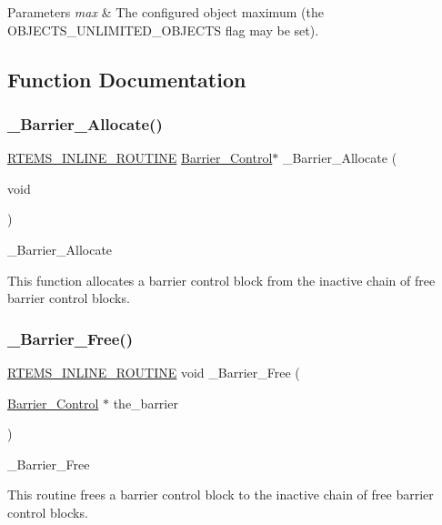 \begin{DoxyParams}{Parameters}
{\em max} & The configured object maximum (the O\+B\+J\+E\+C\+T\+S\+\_\+\+U\+N\+L\+I\+M\+I\+T\+E\+D\+\_\+\+O\+B\+J\+E\+C\+TS flag may be set). \\
\hline
\end{DoxyParams}


\subsection{Function Documentation}
\mbox{\label{group__ClassicBarrierImpl_gad929c5e3d1b4a3c1343769a04d9a14ac}} 
\subsubsection{\texorpdfstring{\_Barrier\_Allocate()}{\_Barrier\_Allocate()}}
{\footnotesize\ttfamily \mbox{\hyperlink{group__RTEMSScoreBaseDefs_gac216239df231d5dbd15e3520b0b9313f}{R\+T\+E\+M\+S\+\_\+\+I\+N\+L\+I\+N\+E\+\_\+\+R\+O\+U\+T\+I\+NE}} \mbox{\hyperlink{structBarrier__Control}{Barrier\+\_\+\+Control}}$\ast$ \+\_\+\+Barrier\+\_\+\+Allocate (\begin{DoxyParamCaption}\item[{void}]{ }\end{DoxyParamCaption})}



\+\_\+\+Barrier\+\_\+\+Allocate 

This function allocates a barrier control block from the inactive chain of free barrier control blocks. \mbox{\label{group__ClassicBarrierImpl_gae78f26c66aa3821e1afd6ae46b92adc0}} 
\subsubsection{\texorpdfstring{\_Barrier\_Free()}{\_Barrier\_Free()}}
{\footnotesize\ttfamily \mbox{\hyperlink{group__RTEMSScoreBaseDefs_gac216239df231d5dbd15e3520b0b9313f}{R\+T\+E\+M\+S\+\_\+\+I\+N\+L\+I\+N\+E\+\_\+\+R\+O\+U\+T\+I\+NE}} void \+\_\+\+Barrier\+\_\+\+Free (\begin{DoxyParamCaption}\item[{\mbox{\hyperlink{structBarrier__Control}{Barrier\+\_\+\+Control}} $\ast$}]{the\+\_\+barrier }\end{DoxyParamCaption})}



\+\_\+\+Barrier\+\_\+\+Free 

This routine frees a barrier control block to the inactive chain of free barrier control blocks. 
